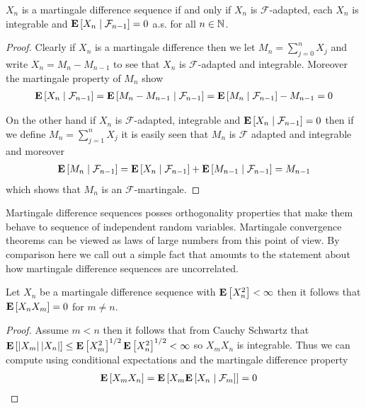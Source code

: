 \begin{prop}\label{MartingaleDifferenceSequence}$X_n$ is a martingale difference sequence if and only if
  $X_n$ is $\mathcal{F}$-adapted, each $X_n$ is integrable and 
  $\cexpectationlong{\mathcal{F}_{n-1}}{X_n} = 0$ a.s. for all $n \in \naturals$.
\end{prop}
\begin{proof}
Clearly if $X_n$ is a martingale difference then we let $M_n =
\sum_{j=0}^n X_j$ and write $X_n = M_n - M_{n-1}$ to see that $X_n$ is
$\mathcal{F}$-adapted and integrable.  Moreover the martingale
property of $M_n$ show
\begin{align*}
\cexpectationlong{\mathcal{F}_{n-1}}{X_n} =
  \cexpectationlong{\mathcal{F}_{n-1}}{M_n - M_{n-1}} =
  \cexpectationlong{\mathcal{F}_{n-1}}{M_n }- M_{n-1} = 0
\end{align*}

On the other hand if $X_n$ is $\mathcal{F}$-adapted, integrable and
$\cexpectationlong{\mathcal{F}_{n-1}}{X_n} = 0$ then if we define $M_n
= \sum_{j=1}^n X_j$ it is easily seen that $M_n$ is $\mathcal{F}$
adapted and integrable and moreover
\begin{align*}
\cexpectationlong{\mathcal{F}_{n-1}}{M_n}  =
  \cexpectationlong{\mathcal{F}_{n-1}}{X_n}+
  \cexpectationlong{\mathcal{F}_{n-1}}{M_{n-1}}  = M_{n-1}
\end{align*}
which shows that $M_n$ is an $\mathcal{F}$-martingale.
\end{proof}

Martingale difference sequences posses orthogonality properties that make them behave to 
sequence of independent random variables.  Martingale convergence theorems can be viewed as
laws of large numbers from this point of view.  By comparison here we call out a simple fact that amounts 
to the statement about how martingale difference sequences are uncorrelated.

\begin{prop}\label{SquareIntegrableMartingaleDifferenceWhiteNoise}Let $X_n$ be a martingale difference sequence with
  $\expectation{X_n^2} < \infty$ then it follows that
  $\expectation{X_n X_m} = 0$ for $m \neq n$.
\end{prop}
\begin{proof}
Assume $m < n$ then it follows that from Cauchy Schwartz that
$\expectation{\abs{X_m} \abs{X_n}} \leq \expectation{X^2_m}^{1/2}
\expectation{X^2_n}^{1/2} < \infty$ so $X_m X_n$ is integrable.  Thus
we can compute using conditional expectations and the martingale
difference property
\begin{align}\label{MartingaleDifferenceLindebergCondition}
\expectation{X_m X_n} &= \expectation{X_m
                        \cexpectationlong{\mathcal{F}_m}{X_n} } = 0
\end{align}
\end{proof}

